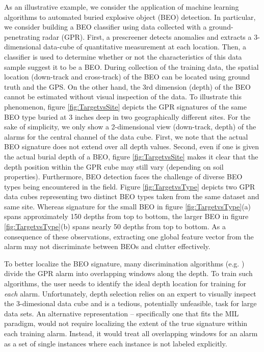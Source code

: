 \documentclass[12pt,dvips]{report}
\numberwithin{equation}{section}
\begin{document}
As an illustrative example, we consider the application of machine
learning algorithms to automated buried explosive object (BEO) detection. In particular,
we consider building a BEO classifier using data collected with a ground-penetrating radar (GPR). First,
a prescreener \cite{torrione2006performance,junloulm2013,friguipaul2009} detects anomalies and extracts a 3-dimensional data-cube of quantitative
measurement at each location. Then, a classifier \cite{friguipaul2009,frigui2007context,sun2005adaptive} is used to determine
whether or not the characteristics of this data sample suggest it
to be a BEO. During collection of the training data, the spatial location (down-track and cross-track) of the BEO can be located using ground truth and the GPS.  On the other hand, the 3rd dimension (depth) of the BEO cannot be estimated without visual inspection of the data.  To illustrate this phenomenon, figure \ref{fig:TargetvsSite} depicts the GPR signatures of the same BEO type buried at 3 inches deep in two geographically different sites. For the sake of simplicity, we only show a 2-dimensional view (down-track, depth) of the alarms for the central channel of the data cube. First, we note that the actual BEO signature does not extend over all depth values. Second, even if one is given the actual burial depth of a BEO, figure \ref{fig:TargetvsSite} makes it clear that the depth position within the GPR cube may still vary (depending on soil properties). Furthermore, BEO detection faces the challenge of diverse BEO types being encountered in the field. Figure \ref{fig:TargetvsType} depicts two GPR data cubes representing two distinct BEO types taken from the same dataset and same site.  Whereas signature for the small BEO in figure \ref{fig:TargetvsType}(a) spans approximately 150 depths from top to bottom, the larger BEO in figure \ref{fig:TargetvsType}(b) spans nearly 50 depths from top to bottom.  As a consequence of these observations, extracting one global feature vector from the alarm may not discriminate between BEOs and clutter effectively. 

To better localize the BEO signature, many discrimination algorithms (e.g. \cite{friguipaul2009,frigui2007context,wilsonjn2007hmm})
divide the GPR alarm into overlapping windows along the depth. To
train such algorithms, the user needs to identify the ideal depth
location for training for \emph{each} alarm. Unfortunately, depth selection relies on an
expert to visually inspect the 3-dimesional data cube and is a tedious, potentially unfeasible, task for large data
sets. An alternative representation -- specifically one that fits
the MIL paradigm, would not require localizing the extent of the true signature within each training alarm.
Instead, it would treat all overlapping windows for an alarm as
a set of single instances where each instance is not labeled explicitly.
\end{document}
